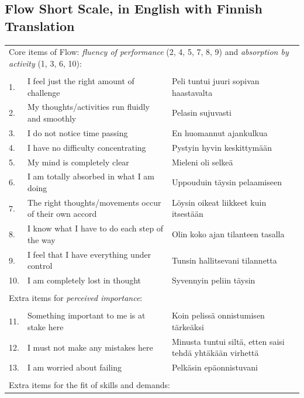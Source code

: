 \documentclass[a4paper,doc,floatsintext,natbib,10pt]{apa6}
\begin{document}
\subsection*{Flow Short Scale, in English with Finnish Translation}

\begin{minipage}{\textwidth}
\begin{tabular}{l p{} p{}}
\multicolumn{3}{l}{Core items of Flow: {\it fluency of performance} (2, 4, 5, 7, 8, 9) and {\it absorption by activity} (1, 3, 6, 10):} \\
\\
1. & I feel just the right amount of challenge    &    Peli tuntui juuri sopivan haastavalta  \\
2. & My thoughts/activities run fluidly and smoothly   & Pelasin sujuvasti \\
3. & I do not notice time passing  & En huomannut ajankulkua \\
4. & I have no difficulty concentrating & Pystyin hyvin keskittym\"{a}\"{a}n \\
5. & My mind is completely clear & Mieleni oli selke\"{a} \\
6. & I am totally absorbed in what I am doing & Uppouduin t\"{a}ysin pelaamiseen \\
7. & The right thoughts/movements occur of their own accord & L\"{o}ysin oikeat liikkeet kuin itsest\"{a}\"{a}n \\
8. & I know what I have to do each step of the way & Olin koko ajan tilanteen tasalla \\
9. & I feel that I have everything under control & Tunsin hallitsevani tilannetta \\
10. & I am completely lost in thought & Syvennyin peliin t\"{a}ysin  \\
\\
\multicolumn{3}{l}{Extra items for {\it perceived importance}:} \\
\\
11. & Something important to me is at stake here & Koin peliss\"{a} onnistumisen t\"{a}rke\"{a}ksi \\
12. & I must not make any mistakes here & Minusta tuntui silt\"{a}, etten saisi tehd\"{a} yht\"{a}k\"{a}\"{a}n virhett\"{a}\\
13. & I am worried about failing & Pelk\"{a}sin ep\"{a}onnistuvani\\
\\
\multicolumn{3}{l}{Extra items for the fit of skills and demands:} \\

\end{tabular}
\end{minipage}
\end{document}
